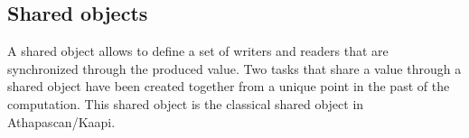 \documentclass[12pt]{report}
\begin{document}



\subsection{Shared objects}
A shared object allows to define a set of writers and readers that are synchronized through the produced value.
Two tasks that share a value through a shared object have been created together from a unique point in the past of the computation. This shared object is the classical shared object in Athapascan/Kaapi.\\
\end{document}

